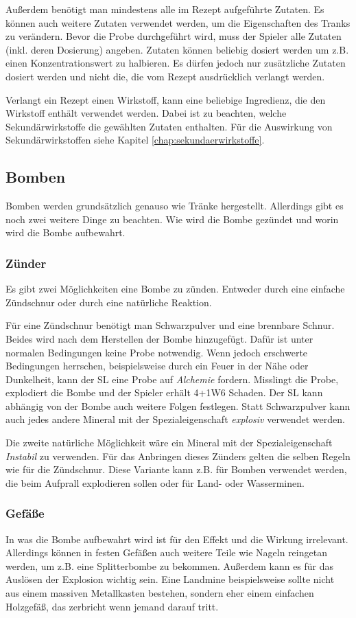 Außerdem benötigt man mindestens alle im Rezept aufgeführte Zutaten. Es können auch weitere Zutaten verwendet werden, um die Eigenschaften des Tranks zu verändern. Bevor die Probe durchgeführt wird, muss der Spieler alle Zutaten (inkl. deren Dosierung) angeben. Zutaten können beliebig dosiert werden um z.B. einen Konzentrationswert zu halbieren. Es dürfen jedoch nur zusätzliche Zutaten dosiert werden und nicht die, die vom Rezept ausdrücklich verlangt werden.

Verlangt ein Rezept einen Wirkstoff, kann eine beliebige Ingredienz, die den Wirkstoff enthält verwendet werden. Dabei ist zu beachten, welche Sekundärwirkstoffe die gewählten Zutaten enthalten. Für die Auswirkung von Sekundärwirkstoffen siehe Kapitel \ref{chap:sekundaerwirkstoffe}.

\subsection{Bomben}
Bomben werden grundsätzlich genauso wie Tränke hergestellt. Allerdings gibt es noch zwei weitere Dinge zu beachten. Wie wird die Bombe gezündet und worin wird die Bombe aufbewahrt.

\subsubsection{Zünder}
Es gibt zwei Möglichkeiten eine Bombe zu zünden. Entweder durch eine einfache Zündschnur oder durch eine natürliche Reaktion.

Für eine Zündschnur benötigt man Schwarzpulver und eine brennbare Schnur. Beides wird nach dem Herstellen der Bombe hinzugefügt. Dafür ist unter normalen Bedingungen keine Probe notwendig. Wenn jedoch erschwerte Bedingungen herrschen, beispielsweise durch ein Feuer in der Nähe oder Dunkelheit, kann der SL eine Probe auf \textit{Alchemie} fordern. Misslingt die Probe, explodiert die Bombe und der Spieler erhält 4+1W6 Schaden. Der SL kann abhängig von der Bombe auch weitere Folgen festlegen. Statt Schwarzpulver kann auch jedes andere Mineral mit der Spezialeigenschaft \textit{explosiv} verwendet werden.

Die zweite natürliche Möglichkeit wäre ein Mineral mit der Spezialeigenschaft \textit{Instabil} zu verwenden. Für das Anbringen dieses Zünders gelten die selben Regeln wie für die Zündschnur. Diese Variante kann z.B. für Bomben verwendet werden, die beim Aufprall explodieren sollen oder für Land- oder Wasserminen.

\subsubsection{Gefäße}
In was die Bombe aufbewahrt wird ist für den Effekt und die Wirkung irrelevant. Allerdings können in festen Gefäßen auch weitere Teile wie Nageln reingetan werden, um z.B. eine Splitterbombe zu bekommen. Außerdem kann es für das Auslösen der Explosion wichtig sein. Eine Landmine beispielsweise sollte nicht aus einem massiven Metallkasten bestehen, sondern eher einem einfachen Holzgefäß, das zerbricht wenn jemand darauf tritt.

